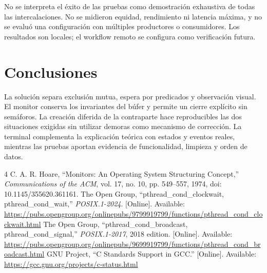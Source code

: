 \documentclass[conference]{IEEEtran}
\begin{document}
No se interpreta el éxito de las pruebas como demostración exhaustiva de todas
las intercalaciones. No se midieron equidad, rendimiento ni latencia máxima, y no
se evaluó una configuración con múltiples productores o consumidores. Los
resultados son locales; el workflow remoto se configura como verificación futura.

\section{Conclusiones}
La solución separa exclusión mutua, espera por predicados y observación visual.
El monitor conserva los invariantes del búfer y permite un cierre explícito sin
semáforos. La creación diferida de la contraparte hace reproducibles las dos
situaciones exigidas sin utilizar demoras como mecanismo de corrección. La
terminal complementa la explicación teórica con estados y eventos reales, mientras
las pruebas aportan evidencia de funcionalidad, limpieza y orden de datos.

\begin{thebibliography}{4}
 C. A. R. Hoare, ``Monitors: An Operating System Structuring
Concept,'' \emph{Communications of the ACM}, vol. 17, no. 10, pp. 549--557,
1974, doi: 10.1145/355620.361161.
 The Open Group, ``pthread\_cond\_clockwait, pthread\_cond\_wait,''
\emph{POSIX.1-2024}. [Online]. Available:
\url{https://pubs.opengroup.org/onlinepubs/9799919799/functions/pthread_cond_clockwait.html}
 The Open Group, ``pthread\_cond\_broadcast, pthread\_cond\_signal,''
\emph{POSIX.1-2017}, 2018 edition. [Online]. Available:
\url{https://pubs.opengroup.org/onlinepubs/9699919799/functions/pthread_cond_broadcast.html}
 GNU Project, ``C Standards Support in GCC.'' [Online]. Available:
\url{https://gcc.gnu.org/projects/c-status.html}
\end{thebibliography}
\end{document}
